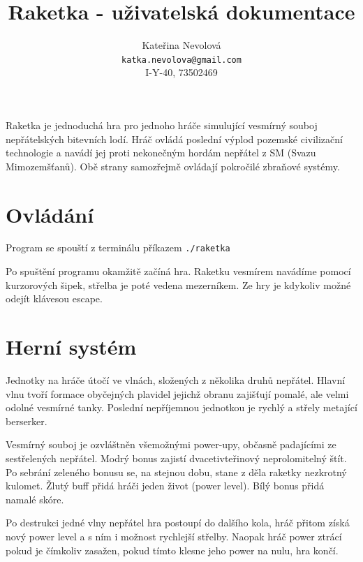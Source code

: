 \documentclass{article}
\title{Raketka - uživatelská dokumentace}
\author{Kateřina Nevolová \\ \texttt{katka.nevolova@gmail.com} \\ I-Y-40, 73502469}
\begin{document}
\maketitle

Raketka je jednoduchá hra pro jednoho hráče simulující vesmírný souboj
nepřátelských bitevních lodí. Hráč ovládá poslední výplod pozemské civilizační
technologie a navádí jej proti nekonečným hordám nepřátel z SM (Svazu
Mimozemšťanů). Obě strany samozřejmě ovládají pokročilé zbraňové systémy.

\section{Ovládání}

Program se spouští z terminálu příkazem 
\texttt{./raketka}

Po spuštění programu okamžitě začíná hra. Raketku vesmírem navádíme pomocí
kurzorových šipek, střelba je poté vedena mezerníkem. Ze hry je kdykoliv možné
odejít klávesou escape.

\section{Herní systém}

Jednotky na hráče útočí ve vlnách, složených z několika druhů nepřátel. Hlavní
vlnu tvoří formace obyčejných plavidel jejichž obranu zajišťují pomalé, ale
velmi odolné vesmírné tanky. Poslední nepříjemnou jednotkou je rychlý a střely metající berserker.

Vesmírný souboj je ozvláštněn všemožnými power-upy, občasně padajícími ze
sestřelených nepřátel. Modrý bonus zajistí dvacetivteřinový neprolomitelný
štít. Po sebrání zeleného bonusu se, na stejnou dobu, stane z děla raketky
nezkrotný kulomet. Žlutý buff přidá hráči jeden život (power level). Bílý bonus
přidá namalé skóre. 

Po destrukci jedné vlny nepřátel hra postoupí do dalšího kola, hráč přitom
získá nový power level a s ním i možnost rychlejší střelby. Naopak hráč
power ztrácí pokud je čímkoliv zasažen, pokud tímto klesne jeho power na nulu,
hra končí.
\end{document}
